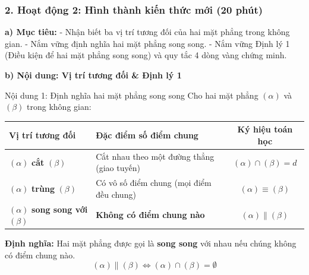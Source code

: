 \documentclass[12pt, a4paper]{article}
\begin{document}
\subsubsection*{2. Hoạt động 2: Hình thành kiến thức mới (20 phút)}

\noindent \textbf{a) Mục tiêu:}
- Nhận biết ba vị trí tương đối của hai mặt phẳng trong không gian.
- Nắm vững định nghĩa hai mặt phẳng song song.
- Nắm vững Định lý 1 (Điều kiện để hai mặt phẳng song song) và quy tắc 4 dòng vàng chứng minh.

\noindent \textbf{b) Nội dung: Vị trí tương đối \& Định lý 1}
\begin{pedabox}{Nội dung 1: Định nghĩa hai mặt phẳng song song}
Cho hai mặt phẳng $(\alpha)$ và $(\beta)$ trong không gian:
\begin{center}
\small
\begin{tabularx}{\textwidth}{|p{3.8cm}|X|c|}
\hline
\textbf{Vị trí tương đối} & \textbf{Đặc điểm số điểm chung} & \textbf{Ký hiệu toán học} \\ \hline
$(\alpha)$ \textbf{cắt} $(\beta)$ & Cắt nhau theo một đường thẳng (giao tuyến) & $(\alpha) \cap (\beta) = d$ \\ \hline
$(\alpha)$ \textbf{trùng} $(\beta)$ & Có vô số điểm chung (mọi điểm đều chung) & $(\alpha) \equiv (\beta)$ \\ \hline
$(\alpha)$ \textbf{song song với} $(\beta)$ & \textbf{Không có điểm chung nào} & $(\alpha) \parallel (\beta)$ \\ \hline
\end{tabularx}
\end{center}
\textbf{Định nghĩa:} Hai mặt phẳng được gọi là \textbf{song song} với nhau nếu chúng không có điểm chung nào.
$$(\alpha) \parallel (\beta) \iff (\alpha) \cap (\beta) = \emptyset$$
\end{pedabox}
\end{document}
